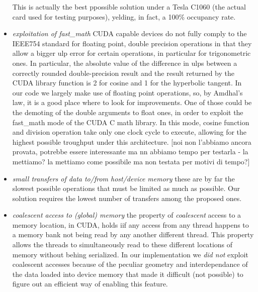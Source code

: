 \begin{itemize}
This is actually the best ppossible solution under a Tesla C1060 (the actual card used for testing purposes), yelding, in fact, a 100\% occupancy rate.
\item \textsl{exploitation of fast\_math} CUDA capable devices do not fully comply to the IEEE754 standard for floating point, double precision operations in that they allow a bigger ulp error for certain operations, in particular for trigonometric ones. In particular, the absolute value of the difference in ulps between a correctly rounded double-precision result and the result returned by the CUDA library function is 2 for cosine and 1 for the hyperbolic tangent. In our code we largely make use of floating point operations, so, by Amdhal's law, it is a good place where to look for improvements. One of those could be the demoting of the double arguments to float ones, in order to exploit the fast\_math mode of the CUDA C math library. In this mode, cosine function and division operation take only one clock cycle to execute, allowing for the highest possible troughput under this architecture. [noi non l'abbiamo ancora provata, potrebbe essere interessante ma nn abbiamo tempo per testarla - la mettiamo? la mettiamo come possibile ma non testata per motivi di tempo?]
\item \textsl{small transfers of data to/from host/device memory} these are by far the slowest possible operations that must be limited as much as possible. Our solution requires the lowest number of transfers among the proposed ones.
\item \textsl{coalescent access to (global) memory} the property of \textsl{coalescent} access to a memory location, in CUDA, holds iif any access from any thread happens to a memory bank not being read by any another different thread. This property allows the threads to simultaneously read to these different locations of memory without behing serialized. In our implementation we \textsl{did not} exploit coalescent accesses because of the peculiar geometry and interdependance of the data loaded into device memory that made it difficult (not possible) to figure out an efficient way of enabling this feature. 
\end{itemize}
